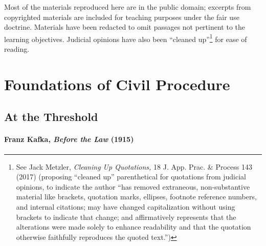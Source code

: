 \documentclass[11pt,letterpaper,twoside]{article}
\begin{document}
Most of the materials reproduced here are in the public domain; excerpts
from copyrighted materials are included for teaching purposes under the
fair use doctrine. Materials have been redacted to omit passages not
pertinent to the learning objectives. Judicial opinions have also been
``cleaned up''\footnote{See Jack Metzler, \emph{Cleaning Up Quotations,}
  18 J. App. Prac. \& Process 143 (2017) (proposing ``cleaned up''
  parenthetical for quotations from judicial opinions, to indicate the
  author ``has removed extraneous, non-substantive material like
  brackets, quotation marks, ellipses, footnote reference numbers, and
  internal citations; may have changed capitalization without using
  brackets to indicate that change; and affirmatively represents that
  the alterations were made solely to enhance readability and that the
  quotation otherwise faithfully reproduces the quoted text.'')} for
ease of reading.

\chapter{Foundations of Civil
Procedure}\label{foundations-of-civil-procedure-1}

\section{At the Threshold}\label{at-the-threshold}

\subsubsection{\texorpdfstring{Franz Kafka, \emph{Before the Law}
(1915)}{Franz Kafka, Before the Law (1915)}}\label{kafka1915}
\end{document}
